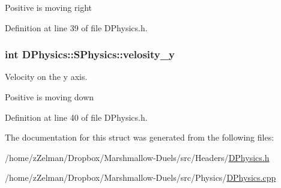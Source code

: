 Positive is moving right 

Definition at line 39 of file D\-Physics.\-h.

\hypertarget{structDPhysics_1_1SPhysics_a58c1f8fa61d0aeece450d7ab789c5013}{
\subsubsection[{velosity\-\_\-y}]{\setlength{\rightskip}{0pt plus 5cm}int D\-Physics\-::\-S\-Physics\-::velosity\-\_\-y}}\label{structDPhysics_1_1SPhysics_a58c1f8fa61d0aeece450d7ab789c5013}


Velocity on the y axis. 

Positive is moving down 

Definition at line 40 of file D\-Physics.\-h.



The documentation for this struct was generated from the following files\-:\begin{DoxyCompactItemize}
\item 
/home/z\-Zelman/\-Dropbox/\-Marshmallow-\/\-Duels/src/\-Headers/\hyperlink{DPhysics_8h}{D\-Physics.\-h}\item 
/home/z\-Zelman/\-Dropbox/\-Marshmallow-\/\-Duels/src/\-Physics/\hyperlink{DPhysics_8cpp}{D\-Physics.\-cpp}\end{DoxyCompactItemize}
